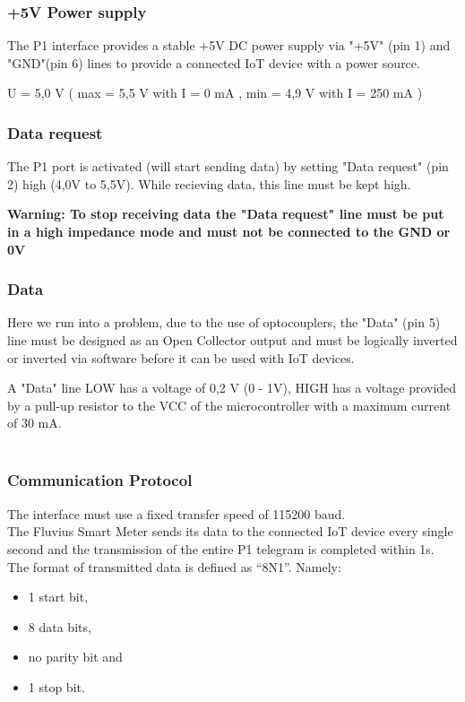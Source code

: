 \documentclass[a4paper,twoside, 12pt]{report}
\theoremstyle{break}
\begin{document}
\subsubsection{+5V Power supply}
The P1 interface provides a stable +5V DC power supply via "+5V" (pin 1) and "GND"(pin 6) lines to provide a connected IoT device with a power source.

U = 5,0 V ( max = 5,5 V with I = 0 mA , min = 4,9 V with I = 250 mA )

\subsubsection{Data request}
The P1 port is activated (will start sending data) by setting "Data request" (pin 2) high (4,0V to 5,5V). While recieving data, this line must be kept high.

\textbf{Warning: To stop receiving data the "Data request" line must be put in a high impedance mode and must not be connected to the GND or 0V}

\subsubsection{Data}
Here we run into a problem, due to the use of optocouplers, the "Data" (pin 5) line must be designed as an Open Collector output and must be logically inverted or inverted via software before it can be used with IoT devices.

A "Data" line LOW has a voltage of 0,2 V (0 - 1V), HIGH has a voltage provided by a pull-up resistor to the VCC of the microcontroller with a maximum current of 30 mA.\ \\ \ \\

\subsubsection{Communication Protocol}
The interface must use a fixed transfer speed of 115200 baud. \ \\

The Fluvius Smart Meter sends its data to the connected IoT device every single second and the transmission of the entire P1 telegram is completed within 1s. \ \\

The format of transmitted data is defined as “8N1”. Namely:

\begin{itemize}
  \item 1 start bit,
  \item 8 data bits,
  \item no parity bit and
  \item 1 stop bit.
\end{itemize}
\end{document}
